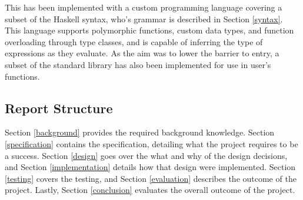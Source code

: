 This has been implemented with a custom programming language covering a subset of the Haskell syntax, who's grammar is described in Section \ref{syntax}. This language supports polymorphic functions, custom data types, and function overloading through type classes, and is capable of inferring the type of expressions as they evaluate. As the aim was to lower the barrier to entry, a subset of the standard library has also been implemented for use in user's functions.

\subsection{Report Structure}
Section \ref{background} provides the required background knowledge. Section \ref{specification} contains the specification, detailing what the project requires to be a success. Section \ref{design} goes over the what and why of the design decisions, and Section \ref{implementation} details how that design were implemented. Section \ref{testing} covers the testing, and Section \ref{evaluation} describes the outcome of the project. Lastly, Section \ref{conclusion} evaluates the overall outcome of the project.